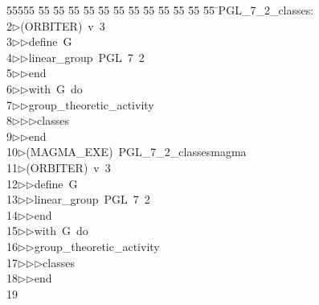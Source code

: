 %
%
\begin{tabbing}
55555 \= 55 \= 55 \= 55 \= 55 \= 55 \= 55 \= 55 \= 55 \= 55 \= 55 \= 55 \= 55 \= \>PGL\_7\_2\_classes:\\[0pt]
2\>$\triangleright$\>(ORBITER)\ v\ 3\ \\[0pt]
3\>$\triangleright$\>$\triangleright$\>define\ G\ \\[0pt]
4\>$\triangleright$\>$\triangleright$\>linear\_group\ PGL\ 7\ 2\ \\[0pt]
5\>$\triangleright$\>$\triangleright$\>end\ \\[0pt]
6\>$\triangleright$\>$\triangleright$\>with\ G\ do\ \\[0pt]
7\>$\triangleright$\>$\triangleright$\>group\_theoretic\_activity\ \\[0pt]
8\>$\triangleright$\>$\triangleright$\>$\triangleright$\>classes\ \\[0pt]
9\>$\triangleright$\>$\triangleright$\>end\\[0pt]
10\>$\triangleright$\>(MAGMA\_EXE)\ PGL\_7\_2\_classesmagma\\[0pt]
11\>$\triangleright$\>(ORBITER)\ v\ 3\ \\[0pt]
12\>$\triangleright$\>$\triangleright$\>define\ G\ \\[0pt]
13\>$\triangleright$\>$\triangleright$\>linear\_group\ PGL\ 7\ 2\ \\[0pt]
14\>$\triangleright$\>$\triangleright$\>end\ \\[0pt]
15\>$\triangleright$\>$\triangleright$\>with\ G\ do\ \\[0pt]
16\>$\triangleright$\>$\triangleright$\>group\_theoretic\_activity\ \\[0pt]
17\>$\triangleright$\>$\triangleright$\>$\triangleright$\>classes\ \\[0pt]
18\>$\triangleright$\>$\triangleright$\>end\\[0pt]
19\>\end{tabbing}
